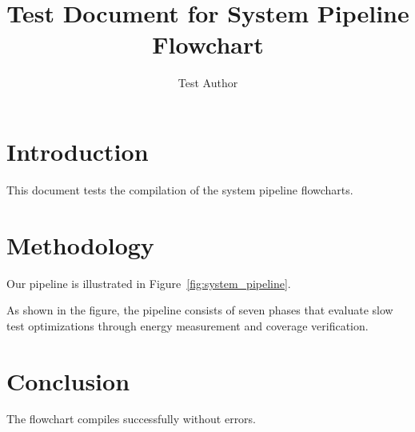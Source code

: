 \documentclass[conference]{IEEEtran}
\begin{document}
\title{Test Document for System Pipeline Flowchart}
\author{Test Author}
\maketitle

\section{Introduction}

This document tests the compilation of the system pipeline flowcharts.

\section{Methodology}

Our pipeline is illustrated in Figure~\ref{fig:system_pipeline}.



As shown in the figure, the pipeline consists of seven phases that evaluate slow test optimizations through energy measurement and coverage verification.

\section{Conclusion}

The flowchart compiles successfully without errors.
\end{document}
